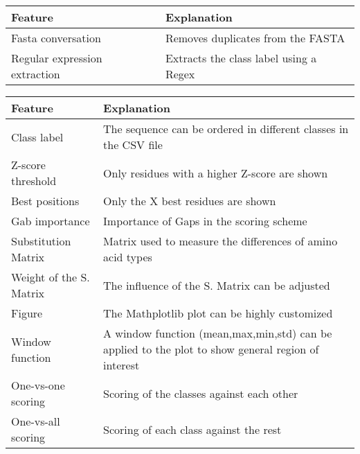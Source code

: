 \documentclass{article}
\begin{document}
\begin{landscape}

\begin{tabularx}{0.7\paperwidth}{l|X} \toprule
    Feature &  Explanation \\ \midrule
    Fasta conversation   & Removes duplicates from the FASTA \\ 
    Regular expression extraction & Extracts the class label using a Regex \\ \bottomrule
    
\end{tabularx}

\vspace{4cm} 

\begin{tabularx}{0.7\paperwidth}{l|X} \toprule
    Feature &  Explanation \\ \midrule
    Class label  & The sequence can be ordered in different classes in the CSV file \\ 
    Z-score threshold & Only residues with a higher Z-score are shown  \\ 
    Best positions & Only the X best residues are shown  \\ 
    Gab importance & Importance of Gaps in the scoring scheme \\
    Substitution Matrix & Matrix used to measure the differences of amino acid types \\
    Weight of the S. Matrix & The influence of the S. Matrix can be adjusted \\
    Figure & The Mathplotlib plot can be highly customized \\
    Window function & A window function (mean,max,min,std) can be applied to the plot to show general region of interest \\
    One-vs-one scoring & Scoring of the classes against each other  \\
    One-vs-all scoring & Scoring of each class against the rest \\ \bottomrule

\end{tabularx}

\end{landscape}
\end{document}
